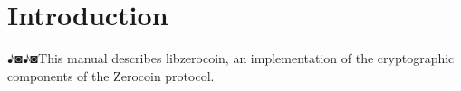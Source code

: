 \section{Introduction}♪◙♪◙This manual describes \textsf{libzerocoin}, an implementation of the cryptographic components of the Zerocoin protocol.